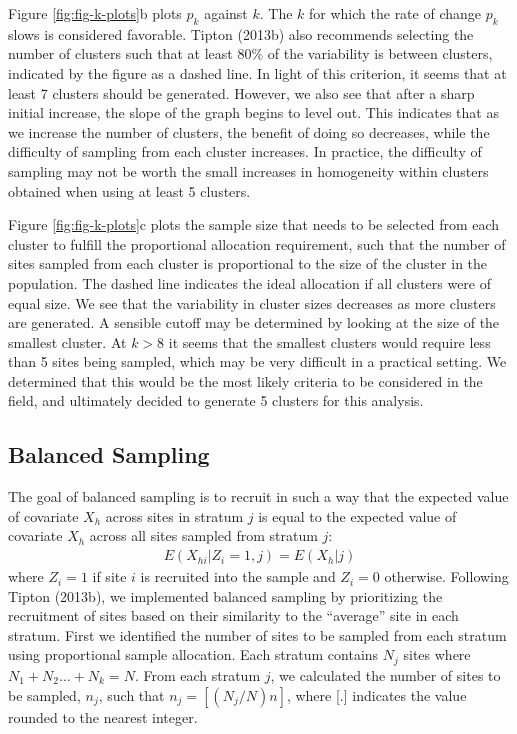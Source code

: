\documentclass[man,floatsintext]{apa6}
\begin{document}
Figure \ref{fig:fig-k-plots}b plots \(p_k\) against \(k\). The \(k\) for which the rate of change \(p_k\) slows is considered favorable. Tipton (2013b) also recommends selecting the number of clusters such that at least 80\% of the variability is between clusters, indicated by the figure as a dashed line. In light of this criterion, it seems that at least 7 clusters should be generated. However, we also see that after a sharp initial increase, the slope of the graph begins to level out. This indicates that as we increase the number of clusters, the benefit of doing so decreases, while the difficulty of sampling from each cluster increases. In practice, the difficulty of sampling may not be worth the small increases in homogeneity within clusters obtained when using at least 5 clusters.

Figure \ref{fig:fig-k-plots}c plots the sample size that needs to be selected from each cluster to fulfill the proportional allocation requirement, such that the number of sites sampled from each cluster is proportional to the size of the cluster in the population. The dashed line indicates the ideal allocation if all clusters were of equal size. We see that the variability in cluster sizes decreases as more clusters are generated. A sensible cutoff may be determined by looking at the size of the smallest cluster. At \(k > 8\) it seems that the smallest clusters would require less than 5 sites being sampled, which may be very difficult in a practical setting. We determined that this would be the most likely criteria to be considered in the field, and ultimately decided to generate 5 clusters for this analysis.

\hypertarget{balanced-sampling}{%
\subsection{Balanced Sampling}\label{balanced-sampling}}

The goal of balanced sampling is to recruit in such a way that the expected value of covariate \(X_h\) across sites in stratum \(j\) is equal to the expected value of covariate \(X_h\) across all sites sampled from stratum \(j\):
\begin{align}
E(X_{hi}|Z_i = 1, j) = E(X_h|j)
\end{align}
where \(Z_i = 1\) if site \(i\) is recruited into the sample and \(Z_i = 0\) otherwise. Following Tipton (2013b), we implemented balanced sampling by prioritizing the recruitment of sites based on their similarity to the \enquote{average} site in each stratum. First we identified the number of sites to be sampled from each stratum using proportional sample allocation. Each stratum contains \(N_j\) sites where \(N_1 + N_2 ... + N_k = N\). From each stratum \(j\), we calculated the number of sites to be sampled, \(n_j\), such that \(n_j = [(N_j/N)n]\), where {[}.{]} indicates the value rounded to the nearest integer.
\end{document}
